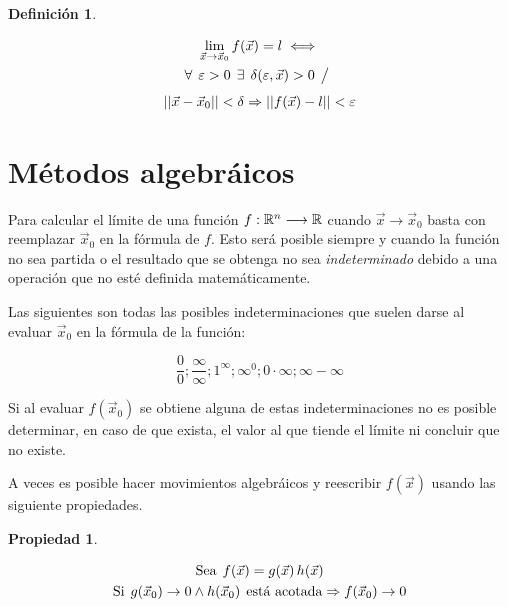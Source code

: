 \documentclass[a5paper,12pt,twoside]{book}
\newtheorem{defn}{{Definición}}[chapter]
\newtheorem{prop}{{Propiedad}}[chapter]
\begin{document}
\begin{mdframed}[style=DefinitionFrame]
    \begin{defn}
    \end{defn}
    \begin{gather*}
        \lim_{\Vec{x} \to \Vec{x}_0} f(\Vec{x})=l \iff
        \\
        \forall \hspace{1ex} \varepsilon >0 \hspace{1ex} \exists \hspace{1ex} \delta(\varepsilon,\Vec{x})>0 \hspace{1ex} \big/ \hspace{1ex}
        \\[1ex]
        {\left|\left| { \Vec{x}-\Vec{x}_0 } \right|\right|} < \delta \Rightarrow {\left|\left| { f(\Vec{x})-l } \right|\right|} < \varepsilon
    \end{gather*}
\end{mdframed}


\section{Métodos algebráicos}

Para calcular el límite de una función $f:\mathbb{R}^n \longrightarrow \mathbb{R}$ cuando $\Vec{x} \to \Vec{x}_0$ basta con reemplazar $\Vec{x}_0$ en la fórmula de $f$.
Esto será posible siempre y cuando la función no sea partida o el resultado que se obtenga no sea \emph{indeterminado} debido a una operación que no esté definida matemáticamente.

Las siguientes son todas las posibles indeterminaciones que suelen darse al evaluar $\Vec{x}_0$ en la fórmula de la función:

\begin{equation*}
    \dfrac{0}{0} ; \dfrac{\infty}{\infty} ; 1^\infty ; \infty^0 ; 0 \cdot \infty ; \infty-\infty
\end{equation*}

Si al evaluar $f(\Vec{x}_0)$ se obtiene alguna de estas indeterminaciones no es posible determinar, en caso de que exista, el valor al que tiende el límite ni concluir que no existe.

A veces es posible hacer movimientos algebráicos y reescribir $f(\Vec{x})$ usando las siguiente propiedades.

\begin{mdframed}[style=PropertyFrame]
    \begin{prop}
    \end{prop}
    \begin{gather*}
        \textrm{Sea} \hspace{1ex} f(\Vec{x}) = g(\Vec{x}) \, h(\Vec{x})
        \\
        \textrm{Si} \hspace{1ex} g(\Vec{x}_0) \to 0 \land h(\Vec{x}_0) \hspace{1ex} \textrm{está acotada}
        \Rightarrow f(\Vec{x}_0) \to 0
    \end{gather*}
\end{mdframed}
\end{document}
